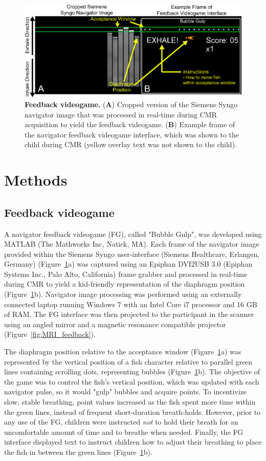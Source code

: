 \begin{figure} 
	\includegraphics{figures/gamepaper/01-FeedbackGame}
	\caption[Feedback videogame]{\textbf{Feedback videogame.} (\textbf{A}) Cropped version of the Siemens Syngo navigator image that was processed in real-time during CMR acquisition to yield the feedback videogame. (\textbf{B}) Example frame of the navigator feedback videogame interface, which was shown to the child during CMR (yellow overlay text was not shown to the child).}
	\label{fig:feedbackgame}
\end{figure}

\section{Methods}
\subsection{Feedback videogame}
	A navigator feedback videogame (FG), called "Bubble Gulp", was developed using MATLAB (The Mathworks Inc, Natick, MA). Each frame of the navigator image provided within the Siemens Syngo user-interface (Siemens Healthcare, Erlangen, Germany) (Figure~\ref{fig:feedbackgame}a) was captured using an Epiphan DVI2USB 3.0 (Epiphan Systems Inc., Palo Alto, California) frame grabber and processed in real-time during CMR to yield a kid-friendly representation of the diaphragm position (Figure~\ref{fig:feedbackgame}b). Navigator image processing was performed using an externally connected laptop running Windows 7 with an Intel Core i7 processor and 16 GB of RAM. The FG interface was then projected to the participant in the scanner using an angled mirror and a magnetic resonance compatible projector (Figure~\ref{fig:MRI_feedback}).
	
	The diaphragm position relative to the acceptance window (Figure~\ref{fig:feedbackgame}a) was represented by the vertical position of a fish character relative to parallel green lines containing scrolling dots, representing bubbles (Figure~\ref{fig:feedbackgame}b). The objective of the game was to control the fish's vertical position, which was updated with each navigator pulse, so it would "gulp" bubbles and acquire points. To incentivize slow, stable breathing, point values increased as the fish spent more time within the green lines, instead of frequent short-duration breath-holds. However, prior to any use of the FG, children were instructed \textit{not} to hold their breath for an uncomfortable amount of time and to breathe when needed. Finally, the FG interface displayed text to instruct children how to adjust their breathing to place the fish in between the green lines (Figure~\ref{fig:feedbackgame}b).

